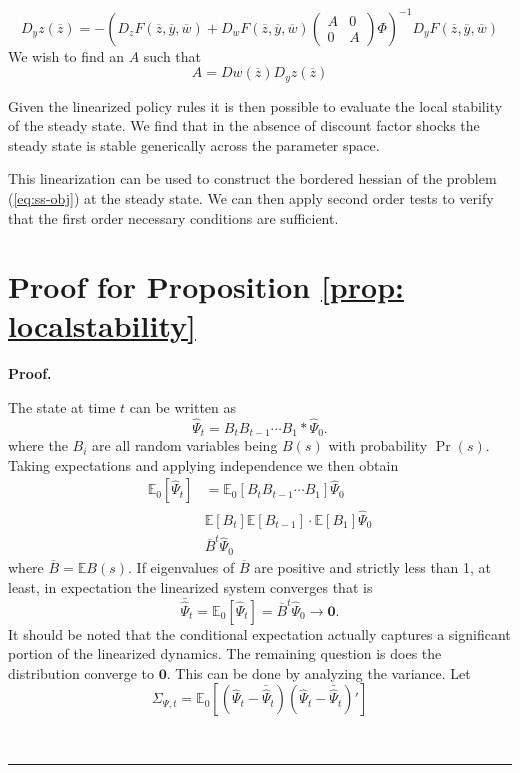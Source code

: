 \documentclass[thmsb,11pt]{article}
\newcommand{\bmat}{\begin{matrix}}
\newcommand{\emat}{\end{matrix}}
\newcommand{\ov}{\overline}
\newenvironment{proof}[1][Proof]{\noindent \textbf{#1.} }{\  \rule{0.5em}{0.5em}}
\begin{document}
\begin{appendix}
\begin{enumerate}
		\[
			  D_y z(\ov z) =-\left(D_zF(\ov z,\ov y, \ov w)+D_w F(\ov z, \ov y, \ov w)\left(\bmat A &0\\0&A\emat\right)\Phi\right)^{-1}D_yF(\ov z,\ov y,\ov w)
		\]  We wish to find an $A$ such that
		\[
			A = Dw(\ov z)   D_y z(\ov z)
		\]
	\end{enumerate}
Given the linearized policy rules it is then possible to evaluate the local stability of the steady state.  We find that in the absence of discount factor shocks the steady state is stable generically across the parameter space.

This linearization can be used to construct the bordered hessian of the problem (\ref{eq:ss-obj}) at the steady state. We can then apply second order tests to verify that the first order necessary conditions are sufficient.
\section{Proof for Proposition \ref{prop: localstability}}
 \begin{proof}

 The state at time $t$ can be written as
 	\[
 		\hat{\Psi}_t = B_tB_{t-1}\cdots B_1*\hat{\Psi}_0.
 	\]where the $B_i$ are all random variables being $B(s)$ with probability $\Pr(s)$. Taking expectations and applying independence we then obtain
% 	
 	\begin{align}
 	\mathbb{E}_0[\hat{\Psi}_t] &= \mathbb{E}_0[B_tB_{t-1}\cdots B_1] \hat{\Psi}_0\\
 	&\mathbb{E}[B_t] \mathbb{E}[B_{t-1}]\cdot\mathbb{E}[B_1] \hat{\Psi}_0\\
 	&\overline B^t \hat{\Psi}_0
 	\end{align}
 	where $\overline B = \mathbb{E}B(s)$.  If eigenvalues of $\overline B$ are positive and strictly less than 1, at least, in expectation the linearized system converges that is
 	\begin{equation}
 		 \bar{\hat{\Psi}}_t = \mathbb{E}_0[\hat{\Psi}_t] = \overline {B}^t \hat{\Psi}_0\to\bm 0.
 	\end{equation}It should be noted that the conditional expectation actually captures a significant portion of the linearized dynamics.
	The remaining question is does the distribution converge to $\bm 0$.  This can be done by analyzing the variance.  Let
 	\[
 		\Sigma_{\Psi,t} = \mathbb{E}_0\left[(\hat{\Psi}_t-\bar {\hat{\Psi}}_t)(\hat{\Psi}_t-\bar {\hat{\Psi}}_t)'\right]
 	\]
 	

\end{proof}
\end{appendix}
\end{document}
